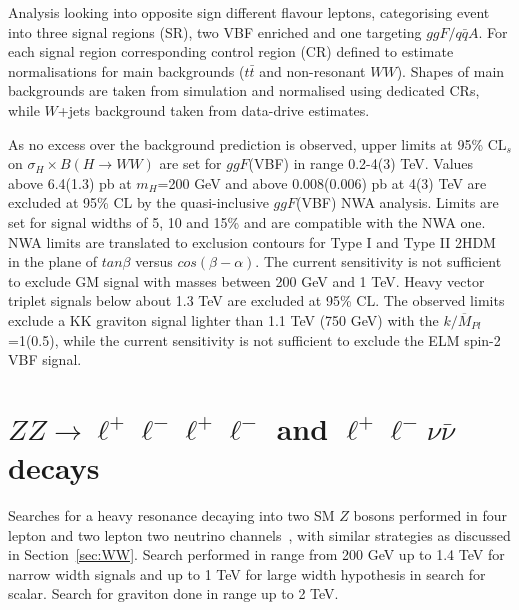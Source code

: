 \documentclass{PoS}
\begin{document}
Analysis looking into opposite sign different flavour leptons, categorising event into three signal regions (SR), two VBF enriched and one targeting $ggF/q\bar{q}A$. For each signal region corresponding control region (CR) defined to estimate normalisations for main backgrounds ($t\bar{t}$ and non-resonant $WW$). 
Shapes of main backgrounds are taken from simulation and normalised using dedicated CRs, while $W$+jets background taken from data-drive estimates.

As no excess over the background prediction is observed, upper limits at 95\% CL$_s$ on $\sigma_H \times B(H\rightarrow WW)$ are set for $ggF$(VBF) in range 0.2-4(3) TeV. 
Values above 6.4(1.3) pb at $m_H$=200 GeV and above 0.008(0.006) pb at 4(3) TeV are excluded at 95\% CL by the quasi-inclusive $ggF$(VBF) NWA analysis.
Limits are set for signal widths of 5, 10 and 15\% and are compatible with the NWA one.
NWA limits are translated to exclusion contours  for Type I and Type II 2HDM in the plane of $tan \beta$ versus $cos(\beta-\alpha)$.
The current sensitivity is not sufficient to exclude GM signal with masses between 200 GeV and 1 TeV.
Heavy vector triplet signals below about 1.3 TeV are excluded at 95\% CL. 
The observed limits exclude a KK graviton signal lighter than 1.1 TeV (750 GeV) with the $k/\overline{M}_{Pl}$=1(0.5), while the current sensitivity is not sufficient to exclude the ELM spin-2 VBF signal. 

\section{$ZZ\rightarrow \ell^+\ell^-\ell^+\ell^-$ and $\ell^+\ell^-\nu\bar{\nu}$ decays} %
\label{sec:ZZ}
Searches for a heavy resonance decaying into two SM $Z$ bosons performed in four lepton and two lepton two neutrino channels~\cite{HIGG-2016-19}, with similar strategies as discussed in Section~\ref{sec:WW}. Search performed in range from 200 GeV up to 1.4 TeV for narrow width signals and up to 1 TeV for large width hypothesis in search for scalar. Search for graviton done in range up to 2 TeV.
\end{document}
